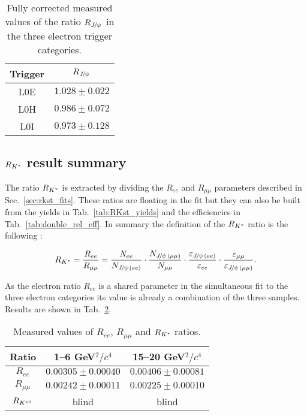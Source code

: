\begin{table}[h!]
\centering
 \caption{Fully corrected measured values of the ratio
 $R_{\jpsi}$ in the three electron trigger categories. }
\begin{tabular}{|c|c|}
\hline
Trigger & $R_{\jpsi}$ \\
\hline
L0E  	   & $ 1.028  \pm 0.022 $ \\
L0H     & $ 0.986  \pm 0.072 $ \\
L0I      & $ 0.973  \pm 0.128 $ \\
\hline
  \end{tabular}
 \label{tab:Rjpsi}
\end{table}

\subsection{$R_{{{K}^*}}$ result summary}

The ratio $R_{{{K}^*}}$ is extracted by dividing the $R_{ee}$ and $R_{\mu\mu}$
parameters described in Sec.~\ref{sec:rkst_fits}. These ratios are 
floating in the fit but they can also be built from the yields
in Tab.~\ref{tab:RKst_yields} and the efficiencies in Tab.~\ref{tab:double_rel_eff}.
In summary the definition of the $R_{{{K}^*}}$ ratio is the following :

\begin{equation}
R_{\Kstar} = \frac{R_{ee}}{R_{\mu\mu}}  
= \frac{N_{ee}}{N_{\jpsi(ee)}} 
\cdot \frac{N_{\jpsi(\mu\mu)}}{N_{\mu\mu}}
\cdot \frac{\varepsilon_{\jpsi(ee)}}{\varepsilon_{ee}} 
\cdot \frac{\varepsilon_{\mu\mu}}{\varepsilon_{\jpsi(\mu\mu)}}.
\end{equation}

As the electron ratio $R_{ee}$ is a shared parameter in the simultaneous fit to the
three electron categories its value is already a combination of the three samples.
Results are shown in Tab.~\ref{tab:RKst_results}.

\begin{table}
\centering
 \caption{Measured values of $R_{ee}$, $R_{\mu\mu}$ and $R_{{{K}^*}}$ ratios.}
\begin{tabular}{|c|c|c|}
\hline
 Ratio 			& 1--6 GeV$^2/c^4$ & 15--20 GeV$^2/c^4$\\ \hline
$R_{ee}$ 	& $ 0.00305  \pm 0.00040  $ 	& $ 0.00406  \pm 0.00081 $ \\
$R_{\mu\mu}$ 	& $ 0.00242  \pm 0.00011 $ 	& $ 0.00225  \pm 0.00010 $ \\
\hline $R_{{{K}^{*0}}}$ 	& blind 	& blind  \\
\hline 
 \end{tabular}
 \label{tab:RKst_results}
\end{table}

